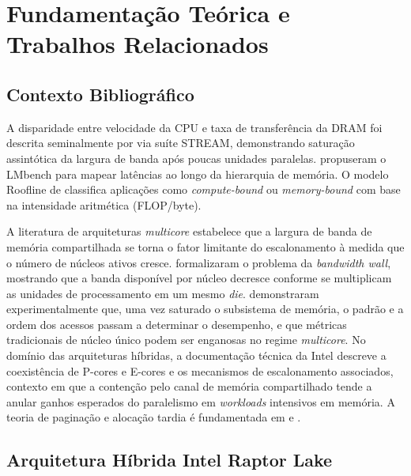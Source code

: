 \documentclass[
	12pt,
	openright,
	oneside,
	a4paper,
	english,
	brazil
	]{abntex2}
\begin{document}
\chapter{Fundamentação Teórica e Trabalhos Relacionados}
\label{chap:fundamentacao}

\section{Contexto Bibliográfico}
\label{sec:trabalhos_relacionados}

A disparidade entre velocidade da CPU e taxa de transferência da DRAM foi descrita seminalmente por  via suíte STREAM, demonstrando saturação assintótica da largura de banda após poucas unidades paralelas.  propuseram o LMbench para mapear latências ao longo da hierarquia de memória. O modelo Roofline de  classifica aplicações como \textit{compute-bound} ou \textit{memory-bound} com base na intensidade aritmética (FLOP/byte).

A literatura de arquiteturas \textit{multicore} estabelece que a largura de banda de memória compartilhada se torna o fator limitante do escalonamento à medida que o número de núcleos ativos cresce.  formalizaram o problema da \textit{bandwidth wall}, mostrando que a banda disponível por núcleo decresce conforme se multiplicam as unidades de processamento em um mesmo \textit{die}.  demonstraram experimentalmente que, uma vez saturado o subsistema de memória, o padrão e a ordem dos acessos passam a determinar o desempenho, e que métricas tradicionais de núcleo único podem ser enganosas no regime \textit{multicore}. No domínio das arquiteturas híbridas, a documentação técnica da Intel \cite{intel2021hybrid} descreve a coexistência de P-cores e E-cores e os mecanismos de escalonamento associados, contexto em que a contenção pelo canal de memória compartilhado tende a anular ganhos esperados do paralelismo em \textit{workloads} intensivos em memória. A teoria de paginação e alocação tardia é fundamentada em  e .

\section{Arquitetura Híbrida Intel Raptor Lake}
\label{sec:raptor_lake}
\end{document}

